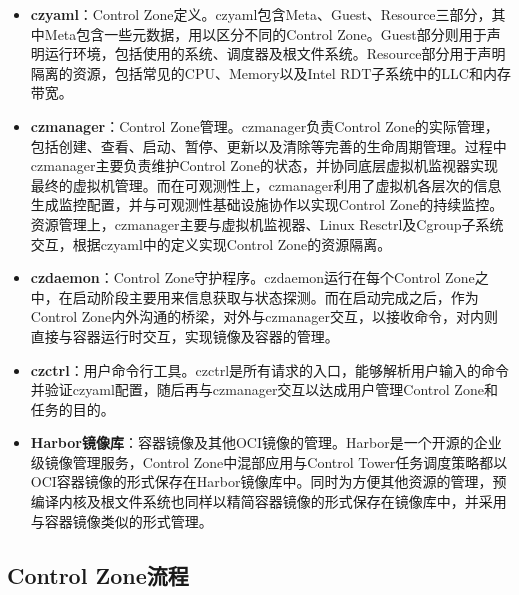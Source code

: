 \begin{itemize}

    \item \textbf{czyaml}：Control Zone定义。czyaml包含Meta、Guest、Resource三部分，其中Meta包含一些元数据，用以区分不同的Control Zone。Guest部分则用于声明运行环境，包括使用的系统、调度器及根文件系统。Resource部分用于声明隔离的资源，包括常见的CPU、Memory以及Intel RDT子系统中的LLC和内存带宽。

    \item \textbf{czmanager}：Control Zone管理。czmanager负责Control Zone的实际管理， 包括创建、查看、启动、暂停、更新以及清除等完善的生命周期管理。过程中czmanager主要负责维护Control Zone的状态，并协同底层虚拟机监视器实现最终的虚拟机管理。而在可观测性上，czmanager利用了虚拟机各层次的信息生成监控配置，并与可观测性基础设施协作以实现Control Zone的持续监控。资源管理上，czmanager主要与虚拟机监视器、Linux Resctrl及Cgroup子系统交互，根据czyaml中的定义实现Control Zone的资源隔离。

    \item \textbf{czdaemon}：Control Zone守护程序。czdaemon运行在每个Control Zone之中，在启动阶段主要用来信息获取与状态探测。而在启动完成之后，作为Control Zone内外沟通的桥梁，对外与czmanager交互，以接收命令，对内则直接与容器运行时交互，实现镜像及容器的管理。

    \item \textbf{czctrl}：用户命令行工具。czctrl是所有请求的入口，能够解析用户输入的命令并验证czyaml配置，随后再与czmanager交互以达成用户管理Control Zone和任务的目的。

    \item \textbf{Harbor镜像库}：容器镜像及其他OCI镜像的管理。Harbor是一个开源的企业级镜像管理服务，Control Zone中混部应用与Control Tower任务调度策略都以OCI容器镜像的形式保存在Harbor镜像库中。同时为方便其他资源的管理，预编译内核及根文件系统也同样以精简容器镜像的形式保存在镜像库中，并采用与容器镜像类似的形式管理。

\end{itemize}

\subsection{Control Zone流程}



